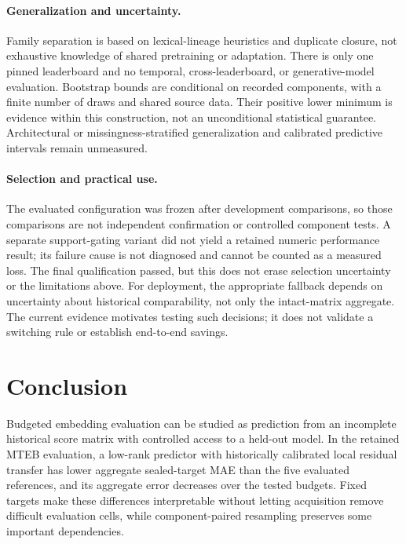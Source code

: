\documentclass{article}
\begin{document}
\paragraph{Generalization and uncertainty.}
Family separation is based on lexical-lineage heuristics and duplicate closure, not exhaustive knowledge of shared pretraining or adaptation. There is only one pinned leaderboard and no temporal, cross-leaderboard, or generative-model evaluation. Bootstrap bounds are conditional on recorded components, with a finite number of draws and shared source data. Their positive lower minimum is evidence within this construction, not an unconditional statistical guarantee. Architectural or missingness-stratified generalization and calibrated predictive intervals remain unmeasured.

\paragraph{Selection and practical use.}
The evaluated configuration was frozen after development comparisons, so those comparisons are not independent confirmation or controlled component tests. A separate support-gating variant did not yield a retained numeric performance result; its failure cause is not diagnosed and cannot be counted as a measured loss. The final qualification passed, but this does not erase selection uncertainty or the limitations above. For deployment, the appropriate fallback depends on uncertainty about historical comparability, not only the intact-matrix aggregate. The current evidence motivates testing such decisions; it does not validate a switching rule or establish end-to-end savings.

\section{Conclusion}
Budgeted embedding evaluation can be studied as prediction from an incomplete historical score matrix with controlled access to a held-out model. In the retained MTEB evaluation, a low-rank predictor with historically calibrated local residual transfer has lower aggregate sealed-target MAE than the five evaluated references, and its aggregate error decreases over the tested budgets. Fixed targets make these differences interpretable without letting acquisition remove difficult evaluation cells, while component-paired resampling preserves some important dependencies.
\end{document}
